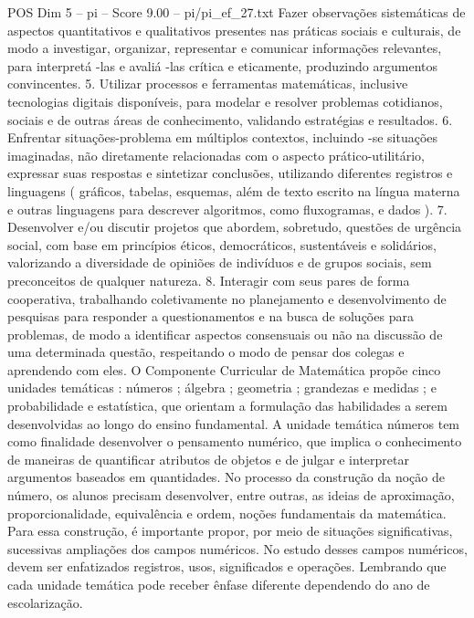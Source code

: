 \begin{textsample}{POS Dim 5 – pi – Score 9.00 – pi/pi\_ef\_27.txt}
Fazer observações sistemáticas de aspectos quantitativos e qualitativos presentes nas práticas sociais e culturais, de modo a investigar, organizar, representar e comunicar informações relevantes, para interpretá -las e avaliá -las crítica e eticamente, produzindo argumentos convincentes. 5.
Utilizar processos e ferramentas matemáticas, inclusive tecnologias digitais disponíveis, para modelar e resolver problemas cotidianos, sociais e de outras áreas de conhecimento, validando estratégias e resultados. 6.
Enfrentar situações-problema em múltiplos contextos, incluindo -se situações imaginadas, não diretamente relacionadas com o aspecto prático-utilitário, expressar suas respostas e sintetizar conclusões, utilizando diferentes registros e linguagens ( gráficos, tabelas, esquemas, além de texto escrito na língua materna e outras linguagens para descrever algoritmos, como fluxogramas, e dados ). 7.
Desenvolver e/ou discutir projetos que abordem, sobretudo, questões de urgência social, com base em princípios éticos, democráticos, sustentáveis e solidários, valorizando a diversidade de opiniões de indivíduos e de grupos sociais, sem preconceitos de qualquer natureza. 8.
Interagir com seus pares de forma cooperativa, trabalhando coletivamente no planejamento e desenvolvimento de pesquisas para responder a questionamentos e na busca de soluções para problemas, de modo a identificar aspectos consensuais ou não na discussão de uma determinada questão, respeitando o modo de pensar dos colegas e aprendendo com eles.
O Componente Curricular de Matemática propõe cinco unidades temáticas : números ; álgebra ; geometria ; grandezas e medidas ; e probabilidade e estatística, que orientam a formulação das habilidades a serem desenvolvidas ao longo do ensino fundamental.
A unidade temática números tem como finalidade desenvolver o pensamento numérico, que implica o conhecimento de maneiras de quantificar atributos de objetos e de julgar e interpretar argumentos baseados em quantidades.
No processo da construção da noção de número, os alunos precisam desenvolver, entre outras, as ideias de aproximação, proporcionalidade, equivalência e ordem, noções fundamentais da matemática.
Para essa construção, é importante propor, por meio de situações significativas, sucessivas ampliações dos campos numéricos.
No estudo desses campos numéricos, devem ser enfatizados registros, usos, significados e operações.
Lembrando que cada unidade temática pode receber ênfase diferente dependendo do ano de escolarização.

\end{textsample}
